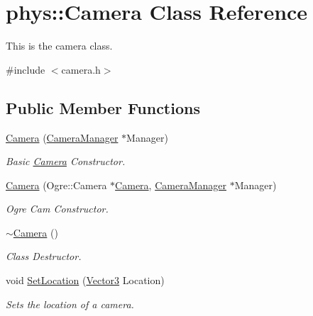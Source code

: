 \hypertarget{classphys_1_1Camera}{
\section{phys::Camera Class Reference}
\label{d9/df8/classphys_1_1Camera}
}


This is the camera class.  




{\ttfamily \#include $<$camera.h$>$}

\subsection*{Public Member Functions}
\begin{DoxyCompactItemize}
\item 
\hyperlink{classphys_1_1Camera_a1309e4191b22440035e360c205b81472}{Camera} (\hyperlink{classphys_1_1CameraManager}{CameraManager} $\ast$Manager)
\begin{DoxyCompactList}\small\item\em Basic \hyperlink{classphys_1_1Camera}{Camera} Constructor. \item\end{DoxyCompactList}\item 
\hyperlink{classphys_1_1Camera_a0510d4f9bf6fb195115272cbd116e8dd}{Camera} (Ogre::Camera $\ast$\hyperlink{classphys_1_1Camera}{Camera}, \hyperlink{classphys_1_1CameraManager}{CameraManager} $\ast$Manager)
\begin{DoxyCompactList}\small\item\em Ogre Cam Constructor. \item\end{DoxyCompactList}\item 
\hyperlink{classphys_1_1Camera_aa45f340a6f7ba0970aa2602a928463ea}{$\sim$Camera} ()
\begin{DoxyCompactList}\small\item\em Class Destructor. \item\end{DoxyCompactList}\item 
void \hyperlink{classphys_1_1Camera_ab1fb572982464212b2fa33e2df6f688b}{SetLocation} (\hyperlink{classphys_1_1Vector3}{Vector3} Location)
\begin{DoxyCompactList}\small\item\em Sets the location of a camera. \item\end{DoxyCompactList}\item 

\end{DoxyCompactItemize}
